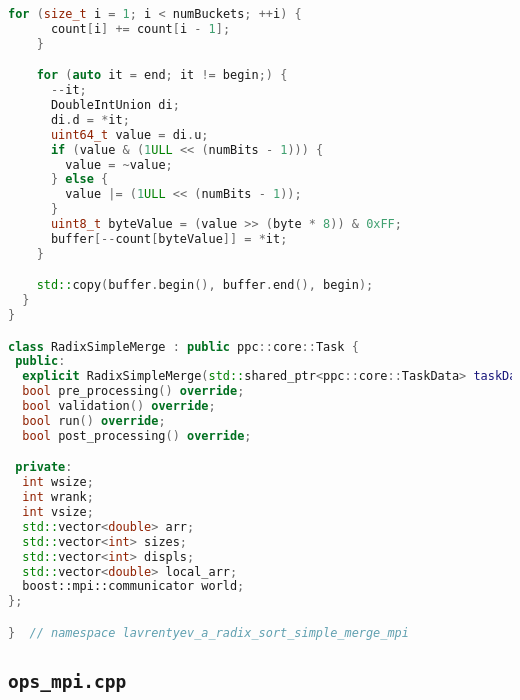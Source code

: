 \documentclass[12pt]{article}
\begin{document}
\begin{lstlisting}[language=C++]
    for (size_t i = 1; i < numBuckets; ++i) {
      count[i] += count[i - 1];
    }

    for (auto it = end; it != begin;) {
      --it;
      DoubleIntUnion di;
      di.d = *it;
      uint64_t value = di.u;
      if (value & (1ULL << (numBits - 1))) {
        value = ~value;
      } else {
        value |= (1ULL << (numBits - 1));
      }
      uint8_t byteValue = (value >> (byte * 8)) & 0xFF;
      buffer[--count[byteValue]] = *it;
    }

    std::copy(buffer.begin(), buffer.end(), begin);
  }
}

class RadixSimpleMerge : public ppc::core::Task {
 public:
  explicit RadixSimpleMerge(std::shared_ptr<ppc::core::TaskData> taskData_) : Task(std::move(taskData_)) {}
  bool pre_processing() override;
  bool validation() override;
  bool run() override;
  bool post_processing() override;

 private:
  int wsize;
  int wrank;
  int vsize;
  std::vector<double> arr;
  std::vector<int> sizes;
  std::vector<int> displs;
  std::vector<double> local_arr;
  boost::mpi::communicator world;
};

}  // namespace lavrentyev_a_radix_sort_simple_merge_mpi
\end{lstlisting}

\subsection*{\texttt{ops\_mpi.cpp}}
\end{document}
